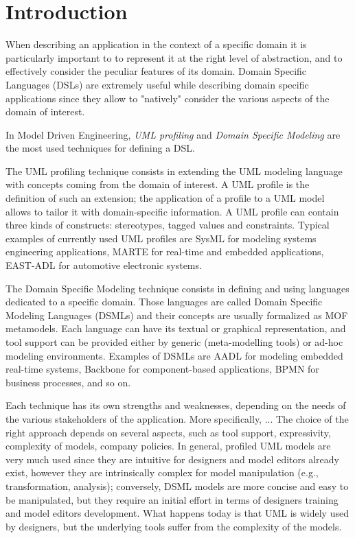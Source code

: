 \section{Introduction}\label{sec:intro}

When describing an application in the context of a specific domain it is particularly important to 
to represent it at the right level of abstraction, and to effectively consider the peculiar features of its domain.
Domain Specific Languages (DSLs) are extremely useful while describing domain specific applications since they allow to "natively" consider the various aspects of the domain of interest. 


In Model Driven Engineering, \textit{UML profiling} and \textit{Domain Specific Modeling} are the most used techniques for defining a DSL. 

The UML profiling technique consists in extending the UML modeling language with concepts coming from the domain of interest.
A UML profile is the definition of such an extension; the application of a profile to a UML model allows to tailor it with domain-specific information. A UML profile can contain three kinds of constructs: stereotypes, tagged values and constraints.
Typical examples of currently used UML profiles are SysML for modeling systems engineering applications, 
MARTE for real-time and embedded applications, EAST-ADL for automotive electronic systems.

The Domain Specific Modeling technique consists in defining and using languages dedicated to a specific domain.
Those languages are called Domain Specific Modeling Languages (DSMLs) and their concepts are usually formalized as MOF metamodels.
Each language can have its textual or graphical representation, and tool support can be provided either by generic (meta-modelling tools) or
ad-hoc modeling environments. 
Examples of DSMLs are AADL for modeling embedded real-time systems, Backbone for component-based applications, BPMN for business processes, and so on. 
 
Each technique has its own strengths and weaknesses, depending on the needs of the various stakeholders of the application.
More specifically, ...
The choice of the right approach depends on several aspects, such as tool support, expressivity, complexity of models, company policies. In general, profiled UML models are very much used since they are intuitive for designers and model editors already exist, however they are intrinsically complex for model manipulation (e.g., transformation, analysis); conversely, DSML models are more concise and easy to be manipulated, but they require an initial effort in terms of designers training and model editors development. 
What happens today is that UML is widely used by designers, but the underlying tools suffer from the complexity of the models. 
 
